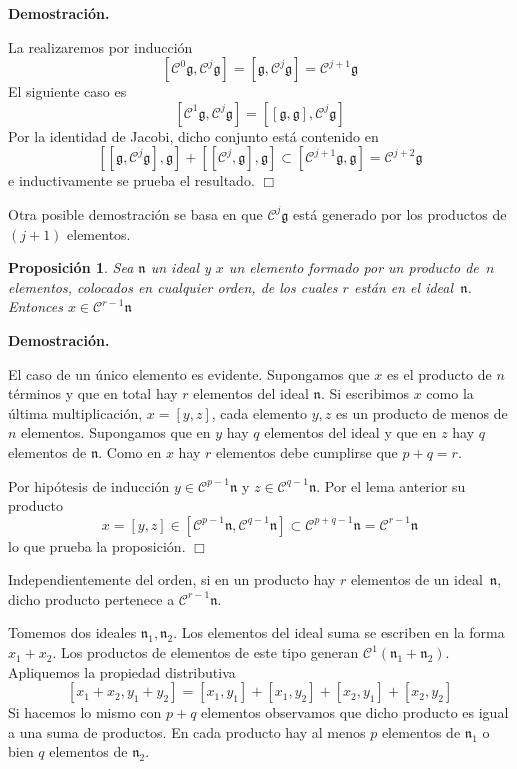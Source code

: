 \documentclass[a4paper,draft,12pt]{scrartcl}
\newtheorem{propo}[teo]{Proposición}%
\newcommand{\dem}{\noindent \textbf{Demostración. }\vspace{0.3 cm}}%
\newcommand{\fin}{ $\Box $ \vspace{0.4 cm}}
\newcommand{\central}{\mathcal{C}}%
\begin{document}
\dem

La realizaremos por inducción
$$
[\central^0\mathfrak{g}, \central^j\mathfrak{g}] = [\mathfrak{g}, \central^j \mathfrak{g}]= \central^{j+1}\mathfrak{g}
$$
El siguiente caso es
$$[\central^1\mathfrak{g}, \central^j\mathfrak{g}]= [[\mathfrak{g},\mathfrak{g}], \central^j\mathfrak{g}]
$$
Por la identidad de Jacobi, dicho conjunto está contenido en 
$$
[[\mathfrak{g},\central^j\mathfrak{g}],\mathfrak{g}]+[[\central^j, \mathfrak{g}], \mathfrak{g}] \subset [\central^{j+1}\mathfrak{g},\mathfrak{g}]= \central^{j+2}\mathfrak{g}
$$
e inductivamente se prueba el resultado. \fin


Otra posible demostración se basa en que $\central^j\mathfrak{g}$ está generado por los productos de $(j+1)$ elementos.

\bigskip

\begin{propo}

Sea $\mathfrak{n}$ un ideal y $x$ un elemento formado por un producto de~$n$ elementos, colocados en cualquier orden, de los cuales $r$ están en el ideal~$\mathfrak{n}$.  Entonces $x \in \central^{r-1} \mathfrak{n}$

\end{propo}

\dem

El caso de un único elemento es evidente.  Supongamos que $x$ es el producto de $n$ términos y que en total hay $r$ elementos del ideal $\mathfrak{n}$. Si escribimos $x$ como la última multiplicación, $x=[y,z]$, cada elemento $y,z$ es un producto de  menos de $n$ elementos.  Supongamos que en $y$ hay $q$ elementos del ideal y que en $z$ hay $q$ elementos de $\mathfrak{n}$. Como en $x$ hay $r$ elementos debe cumplirse que $p+q=r$.

Por hipótesis de inducción $y \in \central^{p-1}\mathfrak{n}$ y $z \in \central^{q-1}\mathfrak{n}$. Por el lema anterior su producto
$$
x=[y,z]\in [\central^{p-1}\mathfrak{n}, \central^{q-1}\mathfrak{n}]\subset \central^{p+q-1}\mathfrak{n}= \central^{r-1}\mathfrak{n}
$$
lo que prueba la proposición. \fin

Independientemente del orden, si en un producto hay $r$ elementos de un ideal~$\mathfrak{n}$, dicho producto pertenece a $\central^{r-1}\mathfrak{n}$.

\bigskip



Tomemos dos ideales $\mathfrak{n}_1, \mathfrak{n}_2$. Los elementos del ideal suma se escriben en la forma $x_1+x_2$.  Los productos de elementos de este tipo generan $\central^1(\mathfrak{n}_1+\mathfrak{n}_2)$.  Apliquemos la propiedad distributiva
$$
[x_1+x_2, y_1+y_2]= [x_1,y_1]+[x_1,y_2]+ [x_2,y_1]+[x_2,y_2]
$$
Si hacemos lo mismo con $p+q$ elementos observamos que dicho producto es igual a una suma de productos.  En cada producto hay al menos $p$ elementos de $\mathfrak{n}_1$ o bien $q$ elementos de $\mathfrak{n}_2$.
\end{document}
